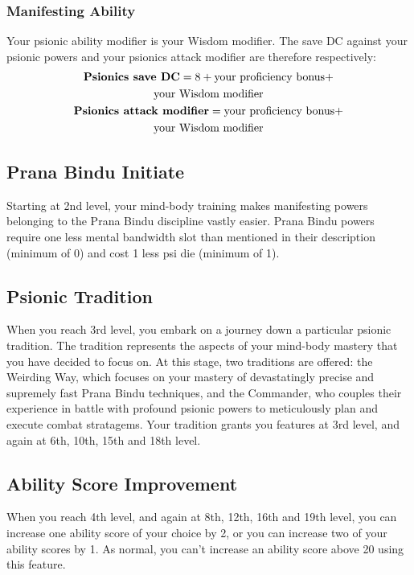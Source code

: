\subsubsection{Manifesting Ability}
Your psionic ability modifier is your Wisdom modifier.
The save DC against your psionic powers and your
psionics attack modifier are therefore respectively:
\small\begin{equation*}
    \begin{gathered}
        \text{\textbf{Psionics save DC}}
            = 8 + \text{your proficiency bonus} + \\
                  \text{your Wisdom modifier} \\
        \text{\textbf{Psionics attack modifier}}
            = \text{your proficiency bonus} + \\
              \text{your Wisdom modifier}
    \end{gathered}
\end{equation*}\normalsize

\subsection{Prana Bindu Initiate}
Starting at 2nd level,
your mind-body training makes manifesting powers
belonging to the Prana Bindu discipline
vastly easier.
Prana Bindu powers require one less mental bandwidth slot
than mentioned in their description (minimum of 0)
and cost 1 less psi die (minimum of 1).

\subsection{Psionic Tradition}
When you reach 3rd level,
you embark on a journey down a particular
psionic tradition.
The tradition represents the aspects of
your mind-body mastery that you have decided
to focus on.
At this stage, two traditions are offered:
the Weirding Way, which focuses on your mastery
of devastatingly precise and supremely fast
Prana Bindu techniques,
and the Commander,
who couples their experience in battle
with profound psionic powers to meticulously
plan and execute combat stratagems.
Your tradition grants you features at 3rd level,
and again at 6th, 10th, 15th and 18th level.

\subsection{Ability Score Improvement}
When you reach 4th level,
and again at 8th, 12th, 16th and 19th level,
you can increase one ability score of your choice by 2,
or you can increase two of your ability scores by 1.
As normal,
you can't increase an ability score above 20 using this feature.

